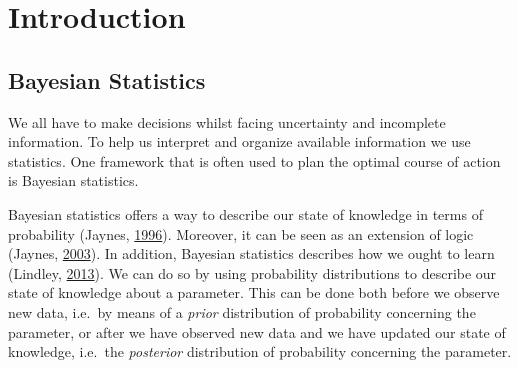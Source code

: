 \documentclass[openright,titlepage,12pt,a4paper]{book}
\begin{document}
\setcounter{tocdepth}{1}
\tableofcontents
\thispagestyle{empty}

\mainmatter

\pagestyle{headings}

\renewcommand{\chaptername}{}

\hypertarget{introduction}{%
\chapter{Introduction}\label{introduction}}

\thispagestyle{empty}

\hypertarget{bayesian-statistics}{%
\section{Bayesian Statistics}\label{bayesian-statistics}}

We all have to make decisions whilst facing uncertainty and incomplete information. To help us interpret and organize available information we use statistics. One framework that is often used to plan the optimal course of action is Bayesian statistics.

Bayesian statistics offers a way to describe our state of knowledge in terms of probability (Jaynes, \protect\hyperlink{ref-jaynes_bayesian_1996}{1996}). Moreover, it can be seen as an extension of logic (Jaynes, \protect\hyperlink{ref-jaynes_probability_2003}{2003}). In addition, Bayesian statistics describes how we ought to learn (Lindley, \protect\hyperlink{ref-lindley_understanding_2013}{2013}). We can do so by using probability distributions to describe our state of knowledge about a parameter. This can be done both before we observe new data, i.e.~by means of a \emph{prior} distribution of probability concerning the parameter, or after we have observed new data and we have updated our state of knowledge, i.e.~the \emph{posterior} distribution of probability concerning the parameter.
\end{document}
